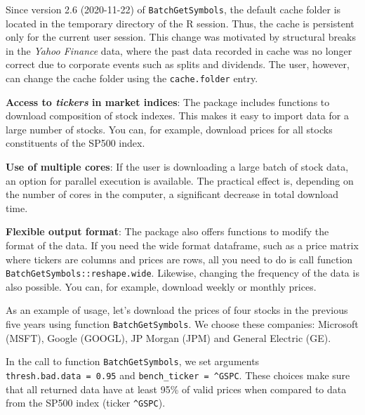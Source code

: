 \documentclass[
  12pt,
]{book}
\newenvironment{rmdimportant}
{\begin{importantblock}
		
	} {\end{importantblock}}
\begin{document}
\begin{rmdimportant}
Since version 2.6 (2020-11-22) of \texttt{BatchGetSymbols}, the default
cache folder is located in the temporary directory of the R session.
Thus, the cache is persistent only for the current user session. This
change was motivated by structural breaks in the \emph{Yahoo Finance}
data, where the past data recorded in cache was no longer correct due to
corporate events such as splits and dividends. The user, however, can
change the cache folder using the \texttt{cache.folder} entry.
\end{rmdimportant}

\textbf{Access to \emph{tickers} in market indices}: The package includes functions to download composition of stock indexes. This makes it easy to import data for a large number of stocks. You can, for example, download prices for all stocks constituents of the SP500 index.

\textbf{Use of multiple cores}: If the user is downloading a large batch of stock data, an option for parallel execution is available. The practical effect is, depending on the number of cores in the computer, a significant decrease in total download time.

\textbf{Flexible output format}: The package also offers functions to modify the format of the data. If you need the wide format dataframe, such as a price matrix where tickers are columns and prices are rows, all you need to do is call function \texttt{BatchGetSymbols::reshape.wide}. Likewise, changing the frequency of the data is also possible. You can, for example, download weekly or monthly prices.

As an example of usage, let's download the prices of four stocks in the previous five years using function \texttt{BatchGetSymbols}. We choose these companies: Microsoft (MSFT), Google (GOOGL), JP Morgan (JPM) and General Electric (GE).  

In the call to function \texttt{BatchGetSymbols}, we set arguments \texttt{thresh.bad.data\ =\ 0.95} and \texttt{bench\_ticker\ =\ \textquotesingle{}\^{}GSPC\textquotesingle{}}. These choices make sure that all returned data have at least 95\% of valid prices when compared to data from the SP500 index (ticker \texttt{\textquotesingle{}\^{}GSPC\textquotesingle{}}).
\end{document}
